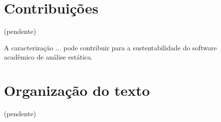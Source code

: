 \section{Contribuições}

(pendente)

A caracterização ... pode contribuir para a sustentabilidade do software acadêmico de análise estática.

\section{Organização do texto}

(pendente)

%
%
%
%
%


